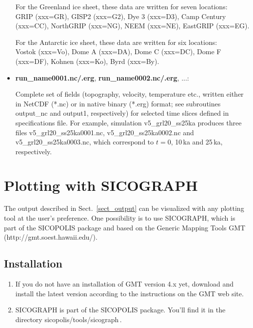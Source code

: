 \documentclass[12pt,a4paper]{article}
\begin{document}
\begin{itemize}
For the Greenland ice sheet, these data are written for seven locations:
\\
GRIP (xxx=GR), GISP2 (xxx=G2), Dye 3 (xxx=D3), Camp Century (xxx=CC), NorthGRIP (xxx=NG), NEEM (xxx=NE), EastGRIP (xxx=EG).

For the Antarctic ice sheet, these data are written for six locations:
\\
Vostok (xxx=Vo), Dome A (xxx=DA), Dome C (xxx=DC), Dome F (xxx=DF), Kohnen (xxx=Ko), Byrd (xxx=By).

\item \textbf{run\_name0001.nc/.erg}, \textbf{run\_name0002.nc/.erg}, ...:

Complete set of fields (topography, velocity, temperature etc., written either in NetCDF (*.nc) or in native binary (*.erg) format; see subroutines output\_nc and output1, respectively) for selected time slices defined in specifications file.
\linebreak
For example, simulation v5\_grl20\_ss25ka produces three files
\linebreak
v5\_grl20\_ss25ka0001.nc, v5\_grl20\_ss25ka0002.nc and v5\_grl20\_ss25ka0003.nc, which correspond to $t=0$, 10\,ka and 25\,ka, respectively.

\end{itemize}

\clearpage

\section{Plotting with SICOGRAPH}
\label{sect_sicograph}

The output described in Sect.~\ref{sect_output} can be visualized with any plotting tool at the user's preference. One possibility is to use SICOGRAPH, which is part of the SICOPOLIS package and based on the Generic Mapping Tools GMT (http://gmt.soest.hawaii.edu/).

\subsection{Installation}

\begin{enumerate}

\item If you do not have an installation of GMT version 4.x yet, download and install the latest version according to the instructions on the GMT web site.

\item SICOGRAPH is part of the SICOPOLIS package. You'll find it in the directory sicopolis/tools/sicograph\,.

\end{enumerate}
\end{document}
